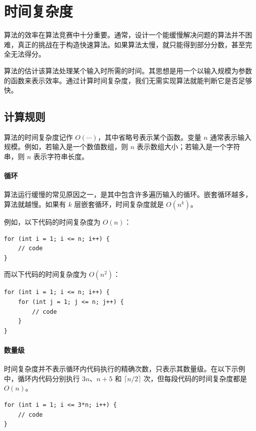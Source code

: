 \chapter{时间复杂度}


算法的效率在算法竞赛中十分重要。通常，设计一个能缓慢解决问题的算法并不困难，真正的挑战在于构造快速算法。如果算法太慢，就只能得到部分分数，甚至完全无法得分。

算法的估计该算法处理某个输入时所需的时间。其思想是用一个以输入规模为参数的函数来表示效率。通过计算时间复杂度，我们无需实现算法就能判断它是否足够快。

\section{计算规则}

算法的时间复杂度记作 $O(\cdots)$，其中省略号表示某个函数。变量 $n$ 通常表示输入规模。例如，若输入是一个数值数组，则 $n$ 表示数组大小；若输入是一个字符串，则 $n$ 表示字符串长度。

\subsubsection*{循环}

算法运行缓慢的常见原因之一，是其中包含许多遍历输入的循环。嵌套循环越多，算法就越慢。如果有 $k$ 层嵌套循环，时间复杂度就是 $O(n^k)$。

例如，以下代码的时间复杂度为 $O(n)$：
\begin{lstlisting}
for (int i = 1; i <= n; i++) {
    // code
}
\end{lstlisting}

而以下代码的时间复杂度为 $O(n^2)$：
\begin{lstlisting}
for (int i = 1; i <= n; i++) {
    for (int j = 1; j <= n; j++) {
        // code
    }
}
\end{lstlisting}

\subsubsection*{数量级}

时间复杂度并不表示循环内代码执行的精确次数，只表示其数量级。在以下示例中，循环内代码分别执行 $3n$、$n+5$ 和 $\lceil n/2 \rceil$ 次，但每段代码的时间复杂度都是 $O(n)$。

\begin{lstlisting}
for (int i = 1; i <= 3*n; i++) {
    // code
}
\end{lstlisting}

